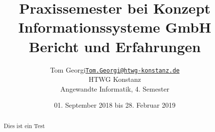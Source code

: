 \documentclass[xcolor=dvipsnames,11pt,paper=a4paper]{report}
\title{
	\Huge\textbf{Praxissemester bei Konzept Informationssysteme GmbH}\\\vspace{20pt}
	\huge{Bericht und Erfahrungen}
}
\author{
	\begin{tabular}{l l}
	Tom Georgi &
	\href{mailto:Tom.Georgi@htwg-konstanz.de}{\texttt{Tom.Georgi@htwg-konstanz.de}}\\
	&HTWG Konstanz\\
	&Angewandte Informatik, 4. Semester
	\end{tabular}
}
\date{01. September 2018 bis 28. Februar 2019}
\begin{document}

\begin{titlepage}
\begin{tabular}{l r}
\end{tabular}
{\let\newpage\relax\maketitle}
\end{titlepage}

\begin{abstract}
Dies ist ein Test
\pagebreak
\end{abstract}
\tableofcontents
\pagebreak

\begingroup
\let\clearpage\relax
\lstlistoflistings
\listoffigures
\listoftables
\endgroup
\pagebreak

%



%


%


%

%

%


\end{document}
